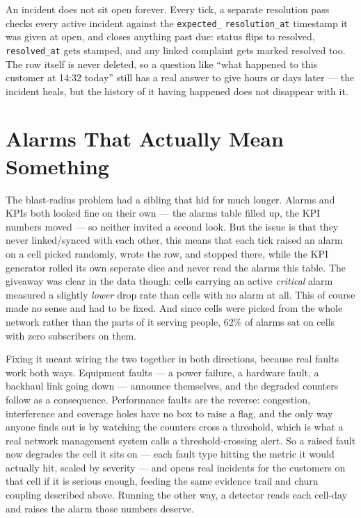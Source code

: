 An incident does not sit open forever. Every tick, a separate resolution
pass checks every active incident against the \texttt{expected\_}
\texttt{resolution\_at} timestamp it was given at open, and closes
anything past due: status flips to resolved, \texttt{resolved\_at} gets
stamped, and any linked complaint gets marked resolved too. The row
itself is never deleted, so a question like ``what happened to this
customer at 14:32 today'' still has a real answer to give hours or days
later --- the incident heals, but the history of it having happened
does not disappear with it.

\section{Alarms That Actually Mean Something}

The blast-radius problem had a sibling that hid for much longer. Alarms
and KPIs both looked fine on their own --- the alarms table filled up,
the KPI numbers moved --- so neither invited a second look. But the issue is 
that they never linked/synced with each other, this means that each tick raised
an alarm on a cell picked randomly, wrote the row, and stopped there, while 
the KPI generator rolled its own seperate dice and never read the alarms this table.
The giveaway was clear in the data though: cells carrying an active \emph{critical}
alarm measured a slightly \emph{lower} drop rate than cells with no alarm at all.
This of course made no sense and had to be fixed. And since cells were picked from the whole network rather than
the parts of it serving people, 62\% of alarms sat on cells with zero
subscribers on them.


Fixing it meant wiring the two together in both directions, because
real faults work both ways. Equipment faults --- a power failure, a
hardware fault, a backhaul link going down --- announce themselves, and
the degraded counters follow as a consequence. Performance faults are
the reverse: congestion, interference and coverage holes have no box to
raise a flag, and the only way anyone finds out is by watching the
counters cross a threshold, which is what a real network management
system calls a threshold-crossing alert. So a raised fault now degrades
the cell it sits on --- each fault type hitting the metric it would
actually hit, scaled by severity --- and opens real incidents for the
customers on that cell if it is serious enough, feeding the same
evidence trail and churn coupling described above. Running the other
way, a detector reads each cell-day and raises the alarm those numbers
deserve.

